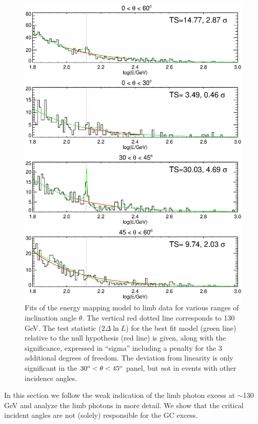 \documentclass[aps,twocolumn,prd,superscriptaddress,showpacs,nofootinbib,fixfloat]{revtex4}
\newcommand{\degree}{^{\rm o}}
\begin{document}
\begin{figure}
  \centering
  \includegraphics[width=1.0\linewidth]{plots/limbfits.ps}
  \caption{Fits of the energy mapping model to limb data for
  various ranges of inclination angle $\theta$.  The
  vertical red dotted line corresponds to 130 GeV.  The test
  statistic ($2\Delta\ln L$) for the best fit model (green
  line) relative to the null hypothesis (red line) is given,
  along with the significance, expressed in ``sigma''
  including a penalty for the 3 additional degrees of
  freedom.  The deviation from linearity is only significant
  in the $30\degree < \theta < 45\degree$ panel, but {\emph not} in events with other incidence angles.}
  \label{fig:limbfits}
\end{figure}


In this section we follow the weak indication of the limb
photon excess at $\sim$130 GeV and analyze the limb photons
in more detail. We show that the critical incident angles
are not (solely) responsible for the GC excess.
\end{document}
